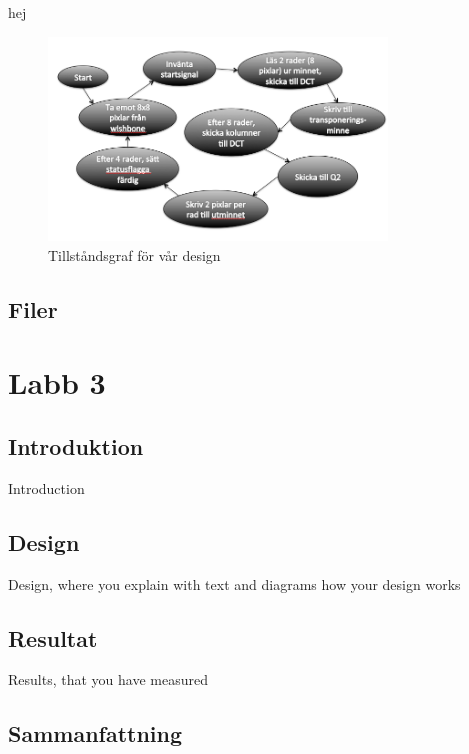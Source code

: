 \documentclass[a4paper]{article}
\begin{document}
hej
\begin{figure}[h]
\centering
\includegraphics[width=340px]{states.png}
\caption{Tillståndsgraf för vår design}
\label{fig:state}
\end{figure}


\subsection{Filer}

\section{Labb 3}
\subsection{Introduktion}
Introduction
\subsection{Design}
Design, where you explain with text and diagrams how your design works
\subsection{Resultat}
Results, that you have measured
\subsection{Sammanfattning}
\end{document}
